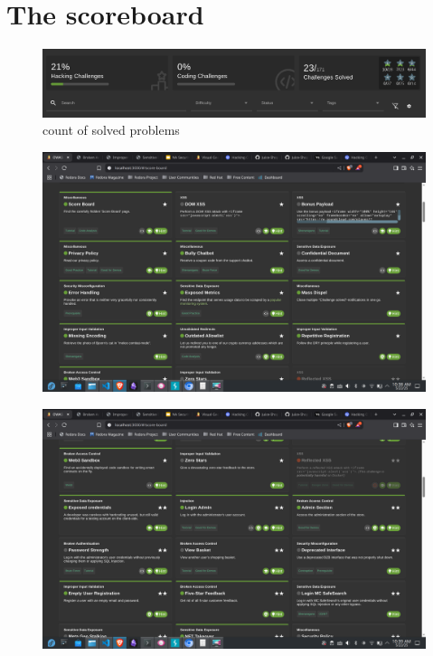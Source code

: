 \documentclass[12pt]{article}
\title{\mytitle}
\author{\textbf{\myauthor}}
\date{\today}
\begin{document}
\onehalfspacing
\maketitle

\section{The scoreboard}
\begin{figure}[H]
    \centering
    \includegraphics[width=1.0\linewidth]{images/image.png}
    \caption{count of solved problems}
\end{figure}
\begin{figure}[H]
    \centering
    \includegraphics[width=1.0\linewidth]{images/image copy.png}
\end{figure}
\begin{figure}[H]
    \centering
    \includegraphics[width=1.0\linewidth]{images/image copy 2.png}
\end{figure}
\end{document}
